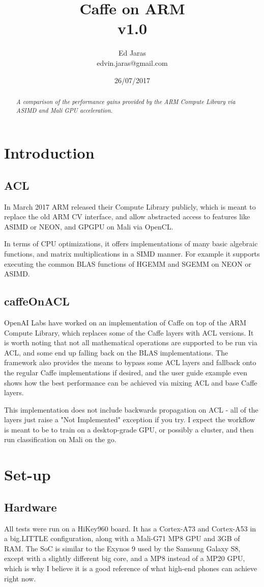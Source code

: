 \documentclass[12pt, a4paper, notitlepage]{report}
\title{Caffe on ARM \\ v1.0}
\author{Ed Jaras \\edvin.jaras@gmail.com}
\date{26/07/2017}
\begin{document}
\maketitle
\thispagestyle{empty}
\begin{abstract}
\textit{A comparison of the performance gains provided by the ARM Compute Library via ASIMD and Mali GPU acceleration.}
\end{abstract}
\section*{Introduction}
\subsection*{ACL}
In March 2017 ARM released their Compute Library publicly, which is meant to replace the old ARM CV interface, and allow abstracted access to features like ASIMD or NEON, and GPGPU on Mali via OpenCL.

In terms of CPU optimizations, it offers implementations of many basic algebraic functions, and matrix multiplications in a SIMD manner. For example it supports executing the common BLAS functions of HGEMM and SGEMM on NEON or ASIMD.

\subsection*{caffeOnACL}
OpenAI Labs have worked on an implementation of Caffe on top of the ARM Compute Library, which replaces some of the Caffe layers with ACL versions. It is worth noting that not all mathematical operations are supported to be run via ACL, and some end up falling back on the BLAS implementations. The framework also provides the means to bypass some ACL layers and fallback onto the regular Caffe implementations if desired, and the user guide example even shows how the best performance can be achieved via mixing ACL and base Caffe layers.

This implementation does not include backwards propagation on ACL - all of the layers just raise a "Not Implemented" exception if you try. I expect the workflow is meant to be to train on a desktop-grade GPU, or possibly a cluster, and then run classification on Mali on the go.

\section*{Set-up}
\subsection*{Hardware}
All tests were run on a HiKey960 board. It has a Cortex-A73 and Cortex-A53 in a big.LITTLE configuration, along with a Mali-G71 MP8 GPU and 3GB of RAM. The SoC is similar to the Exynos 9 used by the Samsung Galaxy S8, except with a slightly different big core, and a MP8 instead of a MP20 GPU, which is why I believe it is a good reference of what high-end phones can achieve right now.
\end{document}

